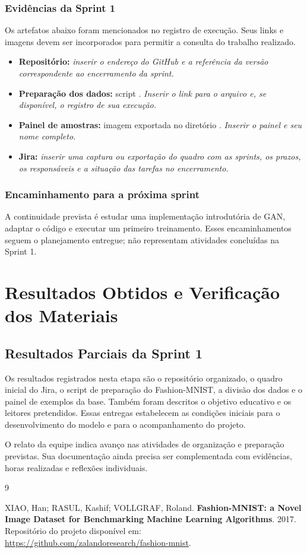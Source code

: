 \documentclass[12pt,a4paper]{article}
\newcommand{\pendente}[1]{\textit{#1}}
\begin{document}
\subsubsection{Evidências da Sprint 1}
Os artefatos abaixo foram mencionados no registro de execução. Seus links e imagens devem ser incorporados para permitir a consulta do trabalho realizado.
\begin{itemize}
\item \textbf{Repositório:} \pendente{inserir o endereço do GitHub e a referência da versão correspondente ao encerramento da sprint.}
\item \textbf{Preparação dos dados:} script . \pendente{Inserir o link para o arquivo e, se disponível, o registro de sua execução.}
\item \textbf{Painel de amostras:} imagem exportada no diretório . \pendente{Inserir o painel e seu nome completo.}
\item \textbf{Jira:} \pendente{inserir uma captura ou exportação do quadro com as sprints, os prazos, os responsáveis e a situação das tarefas no encerramento.}
\end{itemize}

\subsubsection{Encaminhamento para a próxima sprint}
A continuidade prevista é estudar uma implementação introdutória de GAN, adaptar o código e executar um primeiro treinamento. Esses encaminhamentos seguem o planejamento entregue; não representam atividades concluídas na Sprint 1.

\section{Resultados Obtidos e Verificação dos Materiais}
\subsection{Resultados Parciais da Sprint 1}
Os resultados registrados nesta etapa são o repositório organizado, o quadro inicial do Jira, o script de preparação do Fashion-MNIST, a divisão dos dados e o painel de exemplos da base. Também foram descritos o objetivo educativo e os leitores pretendidos. Essas entregas estabelecem as condições iniciais para o desenvolvimento do modelo e para o acompanhamento do projeto.

O relato da equipe indica avanço nas atividades de organização e preparação previstas. Sua documentação ainda precisa ser complementada com evidências, horas realizadas e reflexões individuais.

\begin{thebibliography}{9}

XIAO, Han; RASUL, Kashif; VOLLGRAF, Roland.
\textbf{Fashion-MNIST: a Novel Image Dataset for Benchmarking Machine Learning Algorithms}.
2017. Repositório do projeto disponível em:
\url{https://github.com/zalandoresearch/fashion-mnist}.
\end{thebibliography}
\end{document}
